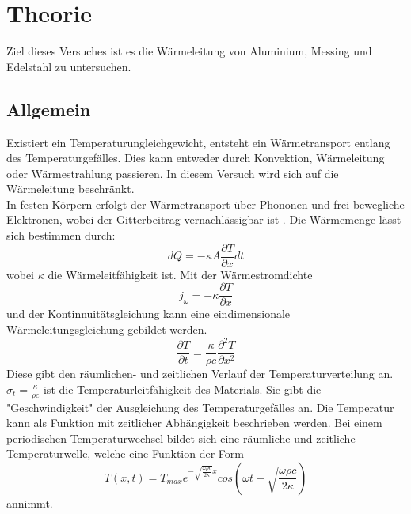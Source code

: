 \section{Theorie}
\label{sec:Theorie}
 
Ziel dieses Versuches ist es die Wärmeleitung von Aluminium, Messing und Edelstahl zu untersuchen.

\subsection{Allgemein}

Existiert ein Temperaturungleichgewicht, entsteht ein Wärmetransport entlang des Temperaturgefälles. 
Dies kann entweder durch Konvektion, Wärmeleitung oder Wärmestrahlung passieren.
In diesem Versuch wird sich auf die Wärmeleitung beschränkt.\\
In festen Körpern erfolgt der Wärmetransport über Phononen und frei bewegliche Elektronen, wobei der Gitterbeitrag vernachlässigbar ist \cite[1]{V204}.
Die Wärmemenge lässt sich bestimmen durch:
\begin{equation}
    dQ = -\kappa A \frac{\partial T}{\partial x} dt
    \label{eqn:Wärmemenge}
\end{equation}
wobei $\kappa$ die Wärmeleitfähigkeit ist.
Mit der Wärmestromdichte
\begin{equation}
    j_{\omega} = -\kappa\frac{\partial T}{\partial x}
    \label{eqn:Wärmestromdichte}
\end{equation}
und der Kontinnuitätsgleichung kann eine eindimensionale Wärmeleitungsgleichung gebildet werden.
\begin{equation}
    \frac{\partial T}{\partial t} = \frac{\kappa}{\rho c} \frac{\partial ^2 T}{\partial x^2}
    \label{eqn:1D-Wärmeleitungsgleichung}
\end{equation}
Diese gibt den räumlichen- und zeitlichen Verlauf der Temperaturverteilung an.
$\sigma_t = \frac{\kappa}{\rho c}$ ist die Temperaturleitfähigkeit des Materials.
Sie gibt die "Geschwindigkeit" der Ausgleichung des Temperaturgefälles an.
Die Temperatur kann als Funktion mit zeitlicher Abhängigkeit beschrieben werden.
Bei einem periodischen Temperaturwechsel bildet sich eine räumliche und zeitliche Temperaturwelle, welche eine Funktion der Form
\begin{equation}
   T(x,t) = T_{max} e^{-\sqrt{\frac{\omega \rho c}{2 \kappa}}x} cos(\omega t - \sqrt{\frac{\omega \rho c}{2 \kappa}})
   \label{eqn:periTempWel}
\end{equation} 
annimmt.
